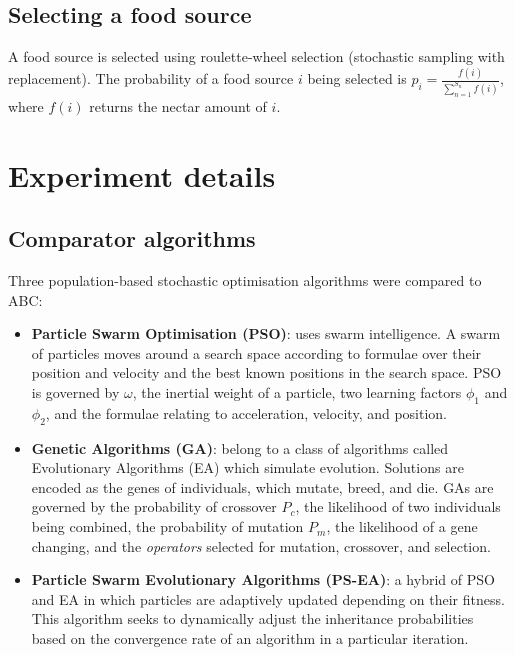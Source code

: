 \documentclass{article}
\begin{document}
\subsection{Selecting a food source}

A food source is selected using roulette-wheel selection (stochastic sampling with replacement). The probability of a food source $i$ being selected is $p_i = \frac{f(i)}{\sum_{n=1}^{S_n} f(i)}$, where $f(i)$ returns the nectar amount of $i$.

\section{Experiment details}

\subsection{Comparator algorithms}

Three population-based stochastic optimisation algorithms were compared to ABC:

\begin{itemize}

	\item{\textbf{Particle Swarm Optimisation (PSO)}: uses swarm intelligence. A swarm of particles moves around a search space according to formulae over their position and velocity and the best known positions in the search space. PSO is governed by $\omega$, the inertial weight of a particle, two learning factors $\phi_1$ and $\phi_2$, and the formulae relating to acceleration, velocity, and position.}
	\item{\textbf{Genetic Algorithms (GA)}: belong to a class of algorithms called Evolutionary Algorithms (EA) which simulate evolution. Solutions are encoded as the genes of individuals, which mutate, breed, and die. GAs are governed by the probability of crossover $P_c$, the likelihood of two individuals being combined, the probability of mutation $P_m$, the likelihood of a gene changing, and the \textit{operators} selected for mutation, crossover, and selection.}
	\item{\textbf{Particle Swarm Evolutionary Algorithms (PS-EA)}: a hybrid of PSO and EA in which particles are adaptively updated depending on their fitness. This algorithm seeks to dynamically adjust the inheritance probabilities based on the convergence rate of an algorithm in a particular iteration.}

\end{itemize}
\end{document}
